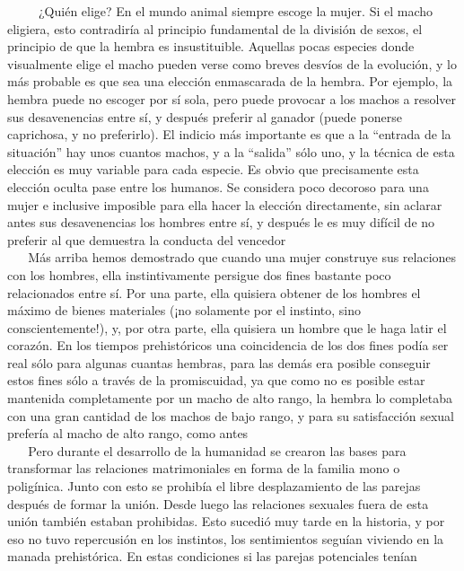 ~ ~ ~ ¿Quién elige? En el mundo animal siempre escoge la mujer. Si el
macho eligiera, esto contradiría al principio fundamental de la división
de sexos, el principio de que la hembra es insustituible. Aquellas pocas
especies donde visualmente elige el macho pueden verse como breves
desvíos de la evolución, y lo más probable es que sea una elección
enmascarada de la hembra. Por ejemplo, la hembra puede no escoger por sí
sola, pero puede provocar a los machos a resolver sus desavenencias
entre sí, y después preferir al ganador (puede ponerse caprichosa, y no
preferirlo). El indicio más importante es que a la ``entrada de la
situación'' hay unos cuantos machos, y a la ``salida'' sólo uno, y la
técnica de esta elección es muy variable para cada especie. Es obvio que
precisamente esta elección oculta pase entre los humanos. Se considera
poco decoroso para una mujer e inclusive imposible para ella hacer la
elección directamente, sin aclarar antes sus desavenencias los hombres
entre sí, y después le es muy difícil de no preferir al que demuestra la
conducta del vencedor\\
\hspace*{0.333em} ~ ~ Más arriba hemos demostrado que cuando una mujer
construye sus relaciones con los hombres, ella instintivamente persigue
dos fines bastante poco relacionados entre sí. Por una parte, ella
quisiera obtener de los hombres el máximo de bienes materiales (¡no
solamente por el instinto, sino conscientemente!), y, por otra parte,
ella quisiera un hombre que le haga latir el corazón. En los tiempos
prehistóricos una coincidencia de los dos fines podía ser real sólo para
algunas cuantas hembras, para las demás era posible conseguir estos
fines sólo a través de la promiscuidad, ya que como no es posible estar
mantenida completamente por un macho de alto rango, la hembra lo
completaba con una gran cantidad de los machos de bajo rango, y para su
satisfacción sexual prefería al macho de alto rango, como antes\\
\hspace*{0.333em} ~ ~ Pero durante el desarrollo de la humanidad se
crearon las bases para transformar las relaciones matrimoniales en forma
de la familia mono o poligínica. Junto con esto se prohibía el libre
desplazamiento de las parejas después de formar la unión. Desde luego
las relaciones sexuales fuera de esta unión también estaban prohibidas.
Esto sucedió muy tarde en la historia, y por eso no tuvo repercusión en
los instintos, los sentimientos seguían viviendo en la manada
prehistórica. En estas condiciones si las parejas potenciales tenían
